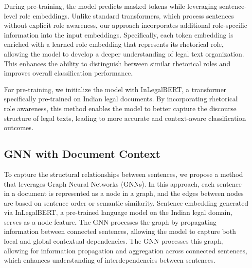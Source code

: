 During pre-training, the model predicts masked tokens while leveraging sentence-level role embeddings. Unlike standard transformers, which process sentences without explicit role awareness, our approach incorporates additional role-specific information into the input embeddings. Specifically, each token embedding is enriched with a learned role embedding that represents its rhetorical role, allowing the model to develop a deeper understanding of legal text organization. This enhances the ability to distinguish between similar rhetorical roles and improves overall classification performance.

For pre-training, we initialize the model with InLegalBERT, a transformer specifically pre-trained on Indian legal documents. By incorporating rhetorical role awareness, this method enables the model to better capture the discourse structure of legal texts, leading to more accurate and context-aware classification outcomes.



\subsection{GNN with Document Context}
To capture the structural relationships between sentences, we propose a method that leverages Graph Neural Networks (GNNs). In this approach, each sentence in a document is represented as a node in a graph, and the edges between nodes are based on sentence order or semantic similarity. Sentence embedding generated via InLegalBERT, a pre-trained language model on the Indian legal domain, serves as a node feature. The GNN processes the graph by propagating information between connected sentences, allowing the model to capture both local and global contextual dependencies. The GNN processes this graph, allowing for information propagation and aggregation across connected sentences, which enhances understanding of interdependencies between sentences.

